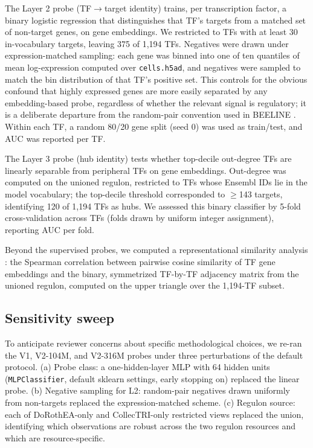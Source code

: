 \documentclass[10pt]{article}
\begin{document}
The Layer 2 probe (TF$\to$target identity) trains, per transcription factor,
a binary logistic regression that distinguishes that TF's targets from a
matched set of non-target genes, on gene embeddings. We restricted to
TFs with at least 30 in-vocabulary targets, leaving 375 of 1,194 TFs.
Negatives were drawn under expression-matched sampling: each gene was
binned into one of ten quantiles of mean log-expression computed over
\texttt{cells.h5ad}, and negatives were sampled to match the bin
distribution of that TF's positive set. This controls for the obvious
confound that highly expressed genes are more easily separated by any
embedding-based probe, regardless of whether the relevant signal is
regulatory; it is a deliberate departure from the random-pair convention
used in BEELINE \citep{pratapa2020beeline}. Within each TF, a random 80/20
gene split (seed 0) was used as train/test, and AUC was reported per TF.

The Layer 3 probe (hub identity) tests whether top-decile out-degree TFs
are linearly separable from peripheral TFs on gene embeddings.
Out-degree was computed on the unioned regulon, restricted to TFs whose
Ensembl IDs lie in the model vocabulary; the top-decile threshold
corresponded to $\geq$143 targets, identifying 120 of 1,194 TFs as hubs. We
assessed this binary classifier by 5-fold cross-validation across TFs
(folds drawn by uniform integer assignment), reporting AUC per fold.

Beyond the supervised probes, we computed a representational similarity
analysis \citep{kriegeskorte2008rsa}: the Spearman correlation between
pairwise cosine similarity of TF gene embeddings and the binary,
symmetrized TF-by-TF adjacency matrix from the unioned regulon, computed
on the upper triangle over the 1,194-TF subset.

\subsection{Sensitivity sweep}\label{sensitivity-sweep}

To anticipate reviewer concerns about specific methodological choices,
we re-ran the V1, V2-104M, and V2-316M probes under three perturbations
of the default protocol. (a) Probe class: a one-hidden-layer MLP with 64
hidden units (\texttt{MLPClassifier}, default sklearn settings, early
stopping on) replaced the linear probe. (b) Negative sampling for L2:
random-pair negatives drawn uniformly from non-targets replaced the
expression-matched scheme. (c) Regulon source: each of DoRothEA-only and
CollecTRI-only restricted views replaced the union, identifying which
observations are robust across the two regulon resources and which are
resource-specific.
\end{document}
